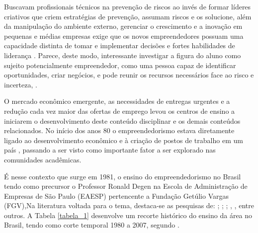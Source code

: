 Buscavam profissionais técnicos na prevenção de riscos ao invés de formar líderes criativos que criem estratégias de prevenção, assumam riscos \cite{sanna_evolution_1999} e os solucione, além da manipulação do ambiente externo, gerenciar o crescimento e a inovação em pequenas e médias empresas exige que os novos empreendedores possuam uma capacidade distinta de tomar e implementar decisões e fortes habilidades de liderança \cite{palmer_chip_2019}. Parece, deste modo, interessante investigar a figura do aluno como sujeito potencialmente empreendedor, como uma pessoa capaz de identificar oportunidades, criar negócios, e pode reunir os recursos necessários face ao risco e incerteza, \cite{pietrovski_alise_2019}.


O mercado econômico emergente, as necessidades de entregas urgentes e a redução cada vez maior das ofertas de emprego levou os centros de ensino a iniciarem o desenvolvimento deste conteúdo disciplinar e os demais conteúdos relacionados. No início dos anos 80 o empreendedorismo estava diretamente ligado ao desenvolvimento econômico e à criação de postos de trabalho em um país \cite{rodrigues_intencao_2019}, passando a ser visto como importante fator a ser explorado nas comunidades acadêmicas. 

É nesse contexto que surge em 1981, o ensino do empreendedorismo no Brasil tendo como precursor o Professor Ronald Degen \cite{degen_o_1989} na Escola de Administração de Empresas de São Paulo (EAESP) pertencente a Fundação Getúlio Vargas (FGV),Na literatura voltada para o tema, destaca-se as pesquisas de: ; ; ; , , entre outros. A Tabela \ref{tabela_1} desenvolve um recorte histórico do ensino da área no Brasil, tendo como corte temporal 1980 a 2007, segundo \cite{fernandes_breve_2013}. 



